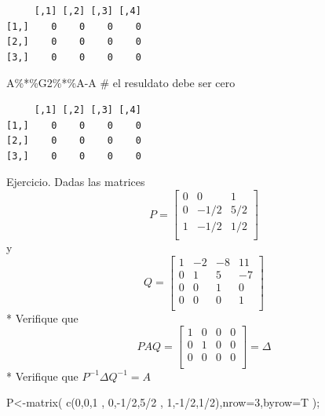\documentclass[
  ignorenonframetext,
  aspectratio=169,
  spanish,
]{beamer}
\newenvironment{Shaded}{\begin{snugshade}}{\end{snugshade}}
\newcommand{\AttributeTok}[1]{\textcolor[rgb]{0.40,0.45,0.13}{#1}}
\newcommand{\CommentTok}[1]{\textcolor[rgb]{0.37,0.37,0.37}{#1}}
\newcommand{\DecValTok}[1]{\textcolor[rgb]{0.68,0.00,0.00}{#1}}
\newcommand{\FunctionTok}[1]{\textcolor[rgb]{0.28,0.35,0.67}{#1}}
\newcommand{\NormalTok}[1]{\textcolor[rgb]{0.00,0.23,0.31}{#1}}
\newcommand{\OtherTok}[1]{\textcolor[rgb]{0.00,0.23,0.31}{#1}}
\newcommand{\SpecialCharTok}[1]{\textcolor[rgb]{0.37,0.37,0.37}{#1}}
\begin{document}
\begin{frame}[fragile]{}
\begin{verbatim}
     [,1] [,2] [,3] [,4]
[1,]    0    0    0    0
[2,]    0    0    0    0
[3,]    0    0    0    0
\end{verbatim}

\begin{Shaded}
\begin{Highlighting}[]
\NormalTok{A}\SpecialCharTok{\%*\%}\NormalTok{G2}\SpecialCharTok{\%*\%}\NormalTok{A}\SpecialCharTok{{-}}\NormalTok{A }\CommentTok{\# el resuldato debe ser cero}
\end{Highlighting}
\end{Shaded}

\begin{verbatim}
     [,1] [,2] [,3] [,4]
[1,]    0    0    0    0
[2,]    0    0    0    0
[3,]    0    0    0    0
\end{verbatim}

\begin{block}{Ejercicio.}
\label{ejercicio.}
Dadas las matrices \[ P=\begin{bmatrix}
0 & 0 & 1\\
0 & -1/2 & 5/2\\
1 & -1/2 & 1/2\\
\end{bmatrix} \] y \[Q=\begin{bmatrix}
1 & -2 & -8 & 11\\
0 & 1 & 5 & -7\\
0 & 0 & 1 & 0\\
0 & 0 & 0 & 1\\\end{bmatrix} 
\] * Verifique que \[PAQ=
\begin{bmatrix}
1 & 0 & 0 & 0\\
0 & 1 & 0 & 0\\
0 & 0 & 0 & 0\\\end{bmatrix}=\Delta\] * Verifique que
\(P^{-1} \Delta Q^{-1}=A\)

\begin{Shaded}
\begin{Highlighting}[]
\NormalTok{P}\OtherTok{\textless{}{-}}\FunctionTok{matrix}\NormalTok{( }\FunctionTok{c}\NormalTok{(}\DecValTok{0}\NormalTok{,}\DecValTok{0}\NormalTok{,}\DecValTok{1}\NormalTok{ ,}
    \DecValTok{0}\NormalTok{,}\SpecialCharTok{{-}}\DecValTok{1}\SpecialCharTok{/}\DecValTok{2}\NormalTok{,}\DecValTok{5}\SpecialCharTok{/}\DecValTok{2}\NormalTok{ ,}
    \DecValTok{1}\NormalTok{,}\SpecialCharTok{{-}}\DecValTok{1}\SpecialCharTok{/}\DecValTok{2}\NormalTok{,}\DecValTok{1}\SpecialCharTok{/}\DecValTok{2}\NormalTok{),}\AttributeTok{nrow=}\DecValTok{3}\NormalTok{,}\AttributeTok{byrow=}\NormalTok{T );}
   

\end{Highlighting}
\end{Shaded}
\end{block}
\end{frame}
\end{document}
